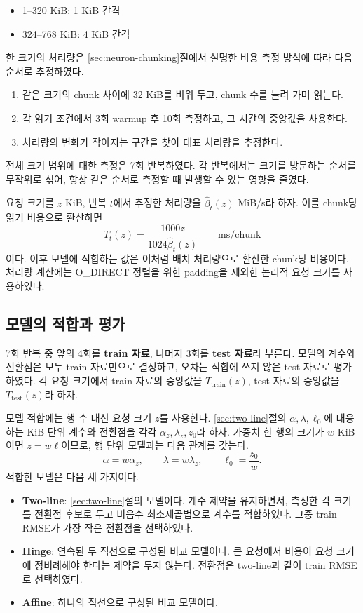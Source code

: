 \begin{itemize}
\item 1--320 KiB: 1 KiB 간격
\item 324--768 KiB: 4 KiB 간격
\end{itemize}

한 크기의 처리량은 \ref{sec:neuron-chunking}절에서 설명한 비용 측정 방식에 따라 다음 순서로 추정하였다.

\begin{enumerate}
\item 같은 크기의 chunk 사이에 32 KiB를 비워 두고, chunk 수를 늘려 가며 읽는다.
\item 각 읽기 조건에서 3회 warmup 후 10회 측정하고, 그 시간의 중앙값을 사용한다.
\item 처리량의 변화가 작아지는 구간을 찾아 대표 처리량을 추정한다.
\end{enumerate}

전체 크기 범위에 대한 측정은 7회 반복하였다. 각 반복에서는 크기를 방문하는 순서를 무작위로 섞어, 항상 같은 순서로 측정할 때 발생할 수 있는 영향을 줄였다.

요청 크기를 $z$ KiB, 반복 $t$에서 추정한 처리량을 $\widehat\beta_t(z)$ MiB/s라 하자. 이를 chunk당 읽기 비용으로 환산하면
\[
T_t(z)=\frac{1000z}{1024\widehat\beta_t(z)}
\qquad \mathrm{ms/chunk}
\]
이다. 이후 모델에 적합하는 값은 이처럼 배치 처리량으로 환산한 chunk당 비용이다. 처리량 계산에는 O\_DIRECT 정렬을 위한 padding을 제외한 논리적 요청 크기를 사용하였다.

\subsection{모델의 적합과 평가}\label{sec:exp-latency-fit}

7회 반복 중 앞의 4회를 \textbf{train 자료}, 나머지 3회를 \textbf{test 자료}라 부른다. 모델의 계수와 전환점은 모두 train 자료만으로 결정하고, 오차는 적합에 쓰지 않은 test 자료로 평가하였다. 각 요청 크기에서 train 자료의 중앙값을 $T_{\mathrm{train}}(z)$, test 자료의 중앙값을 $T_{\mathrm{test}}(z)$라 하자.

모델 적합에는 행 수 대신 요청 크기 $z$를 사용한다. \ref{sec:two-line}절의 $\alpha,\lambda,\ell_0$에 대응하는 KiB 단위 계수와 전환점을 각각 $\alpha_z,\lambda_z,z_0$라 하자. 가중치 한 행의 크기가 $w$ KiB이면 $z=w\ell$이므로, 행 단위 모델과는 다음 관계를 갖는다.
\[
\alpha=w\alpha_z,
\qquad
\lambda=w\lambda_z,
\qquad
\ell_0=\frac{z_0}{w}.
\]
적합한 모델은 다음 세 가지이다.

\begin{itemize}
\item \textbf{Two-line}: \ref{sec:two-line}절의 모델이다. 계수 제약을 유지하면서, 측정한 각 크기를 전환점 후보로 두고 비음수 최소제곱법으로 계수를 적합하였다. 그중 train RMSE가 가장 작은 전환점을 선택하였다.
\item \textbf{Hinge}: 연속된 두 직선으로 구성된 비교 모델이다. 큰 요청에서 비용이 요청 크기에 정비례해야 한다는 제약을 두지 않는다. 전환점은 two-line과 같이 train RMSE로 선택하였다.
\item \textbf{Affine}: 하나의 직선으로 구성된 비교 모델이다.
\end{itemize}

